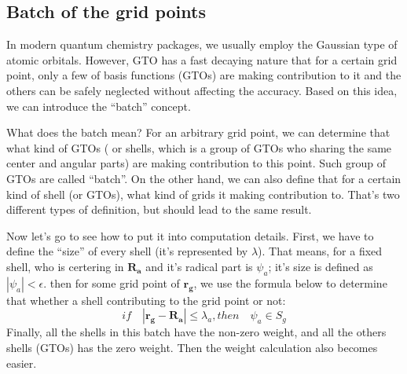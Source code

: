 \subsection{Batch of the grid points}
%
%
%
%
In modern quantum chemistry packages, we usually employ the Gaussian
type of atomic orbitals. However, GTO has a fast decaying nature that
for a certain grid point, only a few of basis functions (GTOs) are
making contribution to it and the others can be safely neglected
without affecting the accuracy. Based on this idea, we can introduce
the ``batch'' concept.

What does the batch mean? For an arbitrary grid point, we can
determine that what kind of GTOs ( or shells, which is a group of
GTOs who sharing the same center and angular parts) are making
contribution to this point. Such group of GTOs are called ``batch''.
On the other hand, we can also define that for a certain kind of
shell (or GTOs), what kind of grids it making contribution to. That's
two different types of definition, but should lead to the same
result. 

Now let's go to see how to put it into computation details. First, we
have to define the ``size'' of every shell (it's represented by
$\lambda$). That means, for a fixed shell, who is certering in
$\bm{R_{a}}$ and it's radical part is $\psi_{a}$; it's size is
defined as $|\psi_{a}| < \epsilon$. then for some grid point of
$\bm{r_{g}}$, we use the formula below to determine that whether a
shell contributing to the grid point or not:
\begin{equation}
 \label{linear_scale_numerical_quadrature_eq:1}
if \quad |\bm{r_{g}} - \bm{R_{a}}| \leq \lambda_{a}, then \quad
\psi_{a} \in S_{g}
\end{equation}
Finally, all the shells in this batch have the non-zero weight, and
all the others shells (GTOs) has the zero weight. Then the weight
calculation also becomes easier.  


\begin{comment}
\subsection{Batch of the grid points}
Since in the grid methods, such as Gauss-Lebedev grid; requires the
interval should be within in $-1 \leq x \leq +1$, but the radical
interval in the single center integral is to be $0 \leq r \leq
\infty$, so it's necessary to strike up a mapping between them.
Moreover, this transformation may bring some delicate effects to the
numerical integration process; which had been carefully discussed by
Treutler\cite{OR}. We will carefully consider it as we encounter
this problem.
\end{comment}

